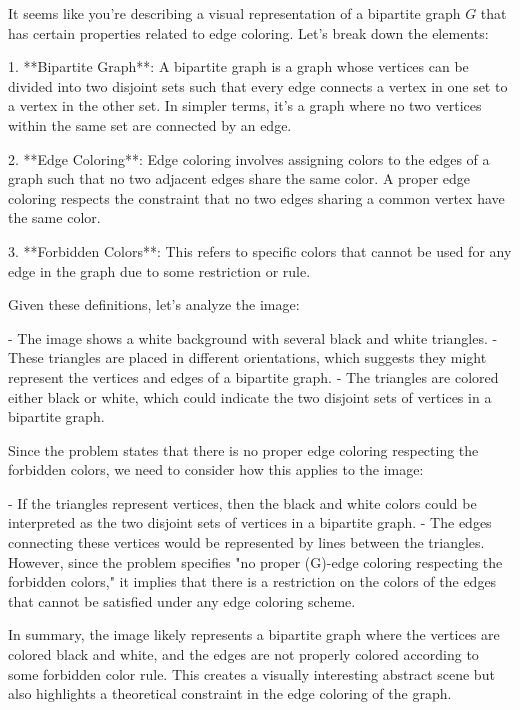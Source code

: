 It seems like you're describing a visual representation of a bipartite graph \( G \) that has certain properties related to edge coloring. Let's break down the elements:

1. **Bipartite Graph**: A bipartite graph is a graph whose vertices can be divided into two disjoint sets such that every edge connects a vertex in one set to a vertex in the other set. In simpler terms, it's a graph where no two vertices within the same set are connected by an edge.

2. **Edge Coloring**: Edge coloring involves assigning colors to the edges of a graph such that no two adjacent edges share the same color. A proper edge coloring respects the constraint that no two edges sharing a common vertex have the same color.

3. **Forbidden Colors**: This refers to specific colors that cannot be used for any edge in the graph due to some restriction or rule.

Given these definitions, let's analyze the image:

- The image shows a white background with several black and white triangles.
- These triangles are placed in different orientations, which suggests they might represent the vertices and edges of a bipartite graph.
- The triangles are colored either black or white, which could indicate the two disjoint sets of vertices in a bipartite graph.

Since the problem states that there is no proper edge coloring respecting the forbidden colors, we need to consider how this applies to the image:

- If the triangles represent vertices, then the black and white colors could be interpreted as the two disjoint sets of vertices in a bipartite graph.
- The edges connecting these vertices would be represented by lines between the triangles. However, since the problem specifies "no proper (G)-edge coloring respecting the forbidden colors," it implies that there is a restriction on the colors of the edges that cannot be satisfied under any edge coloring scheme.

In summary, the image likely represents a bipartite graph where the vertices are colored black and white, and the edges are not properly colored according to some forbidden color rule. This creates a visually interesting abstract scene but also highlights a theoretical constraint in the edge coloring of the graph.